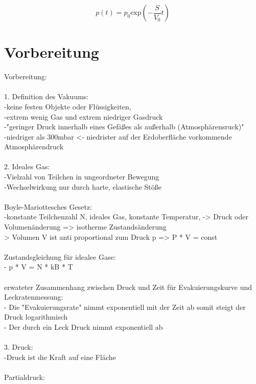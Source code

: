 			\begin{equation}
				p(t) = p_0 \text{exp}\left( - \frac{S}{V_0}t \right)
			\end{equation}

\section{Vorbereitung}      
Vorbereitung: \\
\\
	1. Definition des Vakuums:\\
		-keine festen Objekte oder Flüssigkeiten,\\
                -extrem wenig Gas und extrem niedriger Gasdruck\\
                -"geringer Druck innerhalb eines Gefäßes als außerhalb (Atmosphärensruck)"\\
                -niedriger als 300mbar <- niedrister auf der Erdoberfläche vorkommende Atmosphärendruck\\
\\
	2. Ideales Gas:\\
		-Vielzahl von Teilchen in ungeordneter Bewegung\\
		-Wechselwirkung nur durch harte, elastische Stöße\\
\\
	   Boyle-Mariottesches Gesetz:\\
		-konstante Teilchenzahl N, ideales Gas, konstante Temperatur, -> Druck oder Volumenänderung => isotherme Zustandsänderung\\
		 \-> Volumen V ist anti proportional zum Druck p => P * V = const \\
\\
	   Zustandsgleichung für idealee Gase:\\
		- p * V = N * kB * T\\
\\
	   erwateter Zusammenhang zwischen Druck und Zeit für Evakuierungskurve und Leckratenmessung:\\
	   	- Die "Evakuierungsrate" nimmt exponentiell mit der Zeit ab somit steigt der Druck logarithmisch\\
		- Der durch ein Leck Druck nimmt exponentiell ab\\
\\
	3. Druck:\\
		-Druck ist die Kraft auf eine Fläche\\
\\
	   Partialdruck:\\
